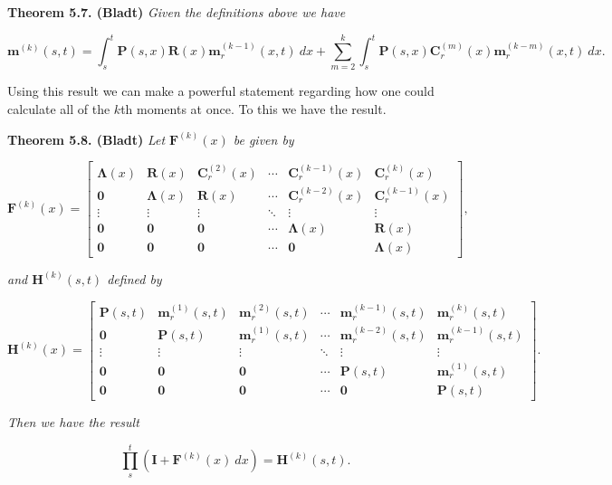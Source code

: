 \documentclass[
]{book}
\begin{document}
\textbf{Theorem 5.7. (Bladt)} \emph{Given the definitions above we have}

\[
\mathbf m^{(k)}(s,t)=\int_s^t\mathbf P(s,x)\mathbf R(x)\mathbf m^{(k-1)}_r(x,t)\ dx+\sum_{m=2}^k\int_s^t\mathbf P(s,x)\mathbf C^{(m)}_r(x)\mathbf m^{(k-m)}_r(x,t)\ dx.
\]

Using this result we can make a powerful statement regarding how one could calculate all of the \(k\)th moments at once. To this we have the result.

\textbf{Theorem 5.8. (Bladt)} \emph{Let \(\mathbf F^{(k)}(x)\) be given by}

\[
\mathbf F^{(k)}(x)=
\begin{bmatrix}
\mathbf \Lambda(x) & \mathbf R(x) & \mathbf C^{(2)}_r(x) & \cdots & \mathbf C^{(k-1)}_r(x) & \mathbf C^{(k)}_r(x)\\
\mathbf 0 & \mathbf \Lambda(x) & \mathbf R(x) & \cdots & \mathbf C^{(k-2)}_r(x) & \mathbf C^{(k-1)}_r(x)\\
\vdots & \vdots & \vdots & \ddots & \vdots & \vdots \\
\mathbf 0 & \mathbf 0 & \mathbf 0 & \cdots &\mathbf \Lambda(x) & \mathbf R(x)\\
\mathbf 0 & \mathbf 0 & \mathbf 0 & \cdots & \mathbf 0 &\mathbf \Lambda(x)
\end{bmatrix},
\]

\emph{and \(\mathbf H^{(k)}(s,t)\) defined by}

\[
\mathbf H^{(k)}(x)=
\begin{bmatrix}
\mathbf P(s,t) & \mathbf m_r^{(1)}(s,t) & \mathbf m_r^{(2)}(s,t) & \cdots & \mathbf m_r^{(k-1)}(s,t) & \mathbf m_r^{(k)}(s,t)\\
\mathbf 0 & \mathbf P(s,t) & \mathbf m_r^{(1)}(s,t) & \cdots & \mathbf m_r^{(k-2)}(s,t) & \mathbf m_r^{(k-1)}(s,t)\\
\vdots & \vdots & \vdots & \ddots & \vdots & \vdots \\
\mathbf 0 & \mathbf 0 & \mathbf 0 & \cdots & \mathbf P(s,t) & \mathbf m_r^{(1)}(s,t)\\
\mathbf 0 & \mathbf 0 & \mathbf 0 & \cdots & \mathbf 0 & \mathbf P(s,t)
\end{bmatrix}.
\]

\emph{Then we have the result}

\[
\prod_s^t(\mathbf I + \mathbf F^{(k)}(x)\ dx)=\mathbf H^{(k)}(s,t).
\]
\end{document}
